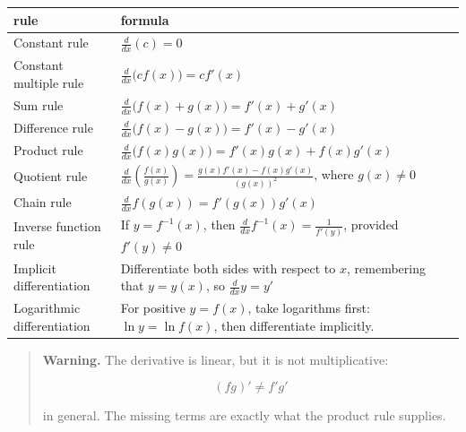 \begin{center}
\renewcommand{\arraystretch}{1.8}
\begin{tabular}{p{}|p{}}
\textbf{rule} & \textbf{formula} \\ \hline

Constant rule &
\(\displaystyle \frac{d}{dx}(c)=0\) \\

Constant multiple rule &
\(\displaystyle \frac{d}{dx}\bigl(c f(x)\bigr)=c f'(x)\) \\

Sum rule &
\(\displaystyle \frac{d}{dx}\bigl(f(x)+g(x)\bigr)=f'(x)+g'(x)\) \\

Difference rule &
\(\displaystyle \frac{d}{dx}\bigl(f(x)-g(x)\bigr)=f'(x)-g'(x)\) \\

Product rule &
\(\displaystyle \frac{d}{dx}\bigl(f(x)g(x)\bigr)=f'(x)g(x)+f(x)g'(x)\) \\

Quotient rule &
\(\displaystyle
\frac{d}{dx}\left(\frac{f(x)}{g(x)}\right)
=
\frac{g(x)f'(x)-f(x)g'(x)}{(g(x))^2}
\),
where \(g(x)\neq0\) \\

Chain rule &
\(\displaystyle
\frac{d}{dx}f(g(x))=f'(g(x))g'(x)
\) \\

Inverse function rule &
If \(y=f^{-1}(x)\), then
\(\displaystyle
\frac{d}{dx}f^{-1}(x)=\frac1{f'(y)}
\),
provided \(f'(y)\neq0\) \\

Implicit differentiation &
Differentiate both sides with respect to \(x\), remembering that \(y=y(x)\), so
\(\displaystyle \frac{d}{dx}y=y'\) \\

Logarithmic differentiation &
For positive \(y=f(x)\), take logarithms first:
\(\displaystyle \ln y=\ln f(x)\), then differentiate implicitly.
\end{tabular}
\end{center}

\begin{quote}
\textbf{Warning.}
The derivative is linear, but it is not multiplicative:

\[
(fg)'\neq f'g'
\]

in general.  The missing terms are exactly what the product rule supplies.
\end{quote}


